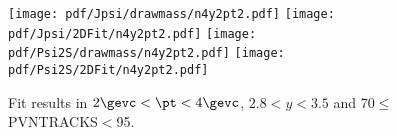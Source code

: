 \begin{figure}[H]
\begin{center}
\texttt{[image: pdf/Jpsi/drawmass/n4y2pt2.pdf]}
\texttt{[image: pdf/Jpsi/2DFit/n4y2pt2.pdf]}
\vspace*{-0.5cm}
\texttt{[image: pdf/Psi2S/drawmass/n4y2pt2.pdf]}
\texttt{[image: pdf/Psi2S/2DFit/n4y2pt2.pdf]}
\vspace*{-0.5cm}
\end{center}
\caption{Fit results in $2\gevc<\pt<4\gevc$, $2.8<y<3.5$ and 70$\leq$PVNTRACKS$<$95.}
\label{Fitn4y2pt2}
\end{figure}

